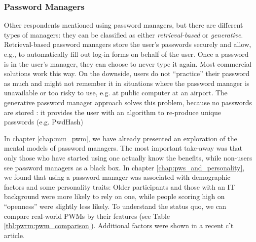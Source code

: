\subsubsection{Password Managers} 
Other respondents mentioned using password managers, but there are different types of managers: they can be classified as either \textit{retrieval-based} or \textit{generative}. Retrieval-based password managers store the user's passwords securely and allow, e.g., to automatically fill out log-in forms on behalf of the user. Once a password is in the user's manager, they can choose to never type it again. Most commercial solutions work this way. On the downside, users do not ``practice'' their password as much and might not remember it in situations where the password manager is unavailable or too risky to use, e.g. at public computer at an airport. The generative password manager approach solves this problem, because no passwords are stored \cite{McCarney2012Tapas}: it provides the user with an algorithm to re-produce unique passwords (e.g. PwdHash)  %

In chapter \ref{chap:mm_pwm}, we have already presented an exploration of the mental models of password managers. The most important take-away was that only those who have started using one actually know the benefits, while non-users see password managers as a black box. In chapter \ref{chap:pws_and_personality}, we found that using a password manager was associated with demographic factors and some personality traits: Older participants and those with an IT background were more likely to rely on one, while people scoring high on ``openness'' were slightly less likely. To understand the status quo, we can compare real-world PWMs by their features (see Table \ref{tbl:pwrm:pwm_comparison}). Additional factors were shown in a recent c't article. 

